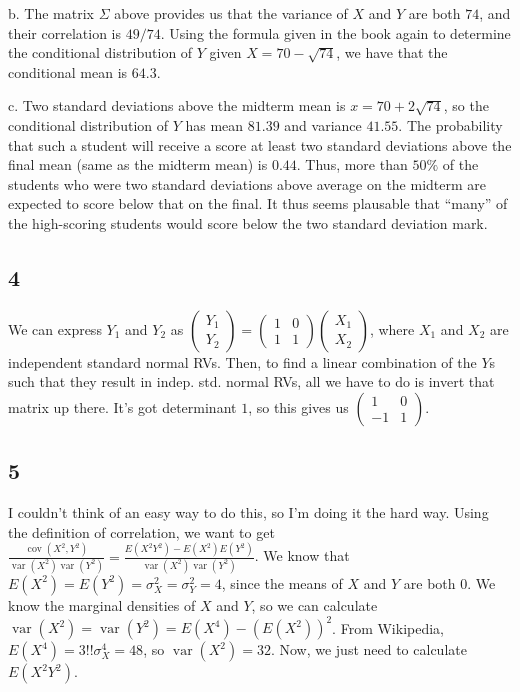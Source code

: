 \documentclass{article}
\newcommand{\openm}{\begin{pmatrix}}
\newcommand{\closem}{\end{pmatrix}}
\DeclareMathOperator{\cov}{cov}
\DeclareMathOperator{\var}{var}
\begin{document}
b. The matrix $\Sigma$ above provides us that the variance of $X$ and $Y$ are both $74$, and their correlation is $49/74$. Using the formula given in the book again to determine the conditional distribution of $Y$ given $X=70-\sqrt{74}$, we have that the conditional mean is $64.3$.

c. Two standard deviations above the midterm mean is $x=70+2\sqrt{74}$, so the conditional distribution of $Y$ has mean $81.39$ and variance $41.55$. The probability that such a student will receive a score at least two standard deviations above the final mean (same as the midterm mean) is $0.44$. Thus, more than $50\%$ of the students who were two standard deviations above average on the midterm are expected to score below that on the final. It thus seems plausable that ``many'' of the high-scoring students would score below the two standard deviation mark.
\subsection*{4}
We can express $Y_1$ and $Y_2$ as $\openm Y_1\\Y_2\closem=\openm1&0\\1&1\closem\openm X_1\\X_2\closem$, where $X_1$ and $X_2$ are independent standard normal RVs. Then, to find a linear combination of the $Y$s such that they result in indep. std. normal RVs, all we have to do is invert that matrix up there. It's got determinant $1$, so this gives us $\openm 1&0\\-1&1\closem$.
\subsection*{5}
I couldn't think of an easy way to do this, so I'm doing it the hard way. Using the definition of correlation, we want to get $\frac{\cov(X^2,Y^2)}{\var(X^2)\var(Y^2)}=\frac{E(X^2Y^2)-E(X^2)E(Y^2)}{\var(X^2)\var(Y^2)}$. We know that $E(X^2)=E(Y^2)=\sigma^2_X=\sigma^2_Y=4$, since the means of $X$ and $Y$ are both $0$. We know the marginal densities of $X$ and $Y$, so we can calculate $\var(X^2)=\var(Y^2)=E(X^4)-(E(X^2))^2$. From Wikipedia, $E(X^4)=3!!\sigma_X^4=48$, so $\var(X^2)=32$. Now, we just need to calculate $E(X^2Y^2)$.
\end{document}
